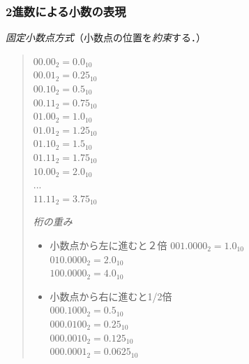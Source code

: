 \documentclass[handout]{beamer}        %
\begin{document}
\begin{frame}
  \frametitle{2進数による小数の表現}
  \emph{固定小数点方式}（小数点の位置を\emph{約束}する．）
  \vfill
  \begin{quote}
    \begin{minipage}{0.4\columnwidth}
      $00.00_2 = 0.0_{10}$  \\
      $00.01_2 = 0.25_{10}$  \\
      $00.10_2 = 0.5_{10}$  \\
      $00.11_2 = 0.75_{10}$  \\
      $01.00_2 = 1.0_{10}$  \\
      $01.01_2 = 1.25_{10}$  \\
      $01.10_2 = 1.5_{10}$  \\
      $01.11_2 = 1.75_{10}$  \\
      $10.00_2 = 2.0_{10}$  \\
      ...\\
      $11.11_2 = 3.75_{10}$
    \end{minipage}
    \begin{minipage}{0.5\columnwidth}
      \emph{桁の重み}
      \begin{itemize}
      \item 小数点から左に進むと２倍
        $001.0000_2 = 1.0_{10}$ \\
        $010.0000_2 = 2.0_{10}$ \\
        $100.0000_2 = 4.0_{10}$ \\
        \vspace{1ex}
      \item 小数点から右に進むと1/2倍\\
        $000.1000_2 = 0.5_{10}$ \\
        $000.0100_2 = 0.25_{10}$ \\
        $000.0010_2 = 0.125_{10}$ \\
        $000.0001_2 = 0.0625_{10}$
      \end{itemize}
    \end{minipage}
  \end{quote}
\end{frame}
\end{document}
